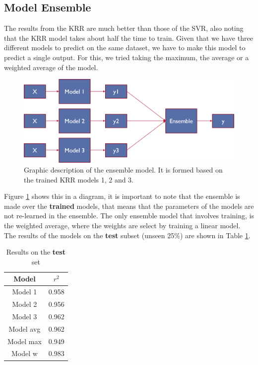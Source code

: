 \subsection{Model Ensemble}

The results from the KRR are much better than those of the SVR, also noting that the KRR model takes about half the time to train. Given that we have three different models to predict on the same dataset, we have to make this model to predict a single output. For this, we tried taking the maximum, the average or a weighted average of the model. 
\begin{figure}[h!]
	\centering
	\includegraphics[width=1\linewidth]{TeX_files/Imagenes/ensemble_model}
	\caption{Graphic description of the ensemble model. It is formed based on the trained KRR models 1, 2 and 3.}
	\label{fig:ensemblemodel}
\end{figure}

Figure \ref{fig:ensemblemodel} shows this in a diagram, it is important to note that the ensemble is made over the \textbf{trained} models, that means that the parameters of the models are not re-learned in the ensemble. The only ensemble model that involves training, is the weighted average, where the weights are select by training a linear model. The results of the models on the \textbf{test} subset (unseen 25\%) are shown in Table \ref{table:test-result}. 

\begin{table}[h!]
	\centering
	\begin{tabular}{|c|c|}
		\hline 
		Model & $r^2$ \\ 
		\hline 
		Model 1 & 0.958 \\ 
		\hline 
		Model 2 & 0.956 \\ 
		\hline 
		Model 3 & 0.962 \\ 
		\hline 
		Model avg & 0.962 \\ 
		\hline 
		Model max & 0.949 \\ 
		\hline 
		Model w & 0.983 \\ 
		\hline 
	\end{tabular} 
    \caption{Results on the \textbf{test} set}
    \label{table:test-result}
\end{table}


